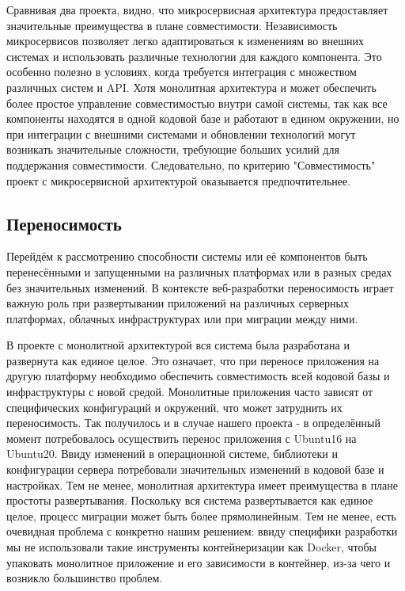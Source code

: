     Сравнивая два проекта, видно, что микросервисная архитектура предоставляет значительные преимущества в плане совместимости. Независимость микросервисов позволяет легко адаптироваться к изменениям во внешних системах и использовать различные технологии для каждого компонента. Это особенно полезно в условиях, когда требуется интеграция с множеством различных систем и API. Хотя монолитная архитектура и может обеспечить более простое управление совместимостью внутри самой системы, так как все компоненты находятся в одной кодовой базе и работают в едином окружении, но при интеграции с внешними системами и обновлении технологий могут возникать значительные сложности, требующие больших усилий для поддержания совместимости. Следовательно, по критерию "Совместимость" проект с микросервисной архитектурой оказывается предпочтительнее.

\subsection{Переносимость}
    Перейдём к рассмотрению способности системы или её компонентов быть перенесёнными и запущенными на различных платформах или в разных средах без значительных изменений. В контексте веб-разработки переносимость играет важную роль при развертывании приложений на различных серверных платформах, облачных инфраструктурах или при миграции между ними.
    
    В проекте с монолитной архитектурой вся система была разработана и развернута как единое целое. Это означает, что при переносе приложения на другую платформу необходимо обеспечить совместимость всей кодовой базы и инфраструктуры с новой средой. Монолитные приложения часто зависят от специфических конфигураций и окружений, что может затруднить их переносимость. Так получилось и в случае нашего проекта - в определённый момент потребовалось осуществить перенос приложения с Ubuntu16 на Ubuntu20. Ввиду изменений в операционной системе, библиотеки и конфигурации сервера потребовали значительных изменений в кодовой базе и настройках. Тем не менее, монолитная архитектура имеет преимущества в плане простоты развертывания. Поскольку вся система развертывается как единое целое, процесс миграции может быть более прямолинейным. Тем не менее, есть очевидная проблема с конкретно нашим решением: ввиду специфики разработки мы не использовали такие инструменты контейнеризации как Docker, чтобы упаковать монолитное приложение и его зависимости в контейнер, из-за чего и возникло большинство проблем.
    
